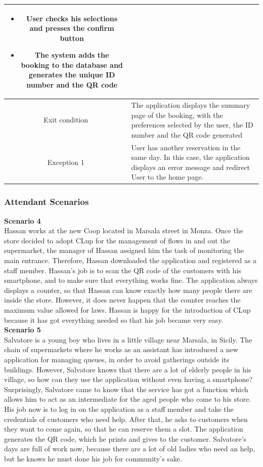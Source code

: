 \documentclass[table, 12pt]{article}
\begin{document}
\begin{longtable}{|c| p{10cm}|}
\begin{itemize}[nosep,after=\strut]
        \item User checks his selections and presses the confirm button
        \item The system adds the booking to the database and generates the unique ID number and the QR code
    \end{itemize}                                                                                                                   \\
    \hline
    Exit condition   & The application displays the summary page of the booking, with the preferences selected by the user, the ID number and the QR code generated
    \\
    \hline
    \hline
    Exception 1      & User has another reservation in the same day. In this case, the application displays an error message and redirect User to the home page.    \\
    \hline
\end{longtable}

\subsubsection{Attendant Scenarios}
\textbf{Scenario 4}\\
Hassan works at the new Coop located in Marsala street in Monza. Once the store decided to adopt CLup for the management of flows in and out the supermarket, the manager of Hassan assigned him the task of monitoring the main entrance. Therefore, Hassan downloaded the application and registered as a staff member. Hassan's job is to scan the QR code of the customers with his smartphone, and to make sure that everything works fine. The application always displays a counter, so that Hassan can know exactly how many people there are inside the store. However, it does never happen that the counter reaches the maximum value allowed for laws. Hassan is happy for the introduction of CLup because it has got everything needed so that his job became very easy.\\

\textbf{Scenario 5}\\
Salvatore is a young boy who lives in a little village near Marsala, in Sicily. The chain of supermarkets where he works as an assistant has introduced a new application for managing queues, in order to avoid gatherings outside its buildings. However, Salvatore knows that there are a lot of elderly people in his village, so how can they use the application without even having a smartphone? Surprisingly, Salvatore came to know that the service has got a function which allows him to act as an intermediate for the aged people who come to his store. His job now is to log in on the application as a staff member and take the credentials of customers who need help. After that, he asks to customers when they want to come again, so that he can reserve them a slot. The application generates the QR code, which he prints and gives to the customer. Salvatore's days are full of work now, because there are a lot of old ladies who need an help, but he knows he must done his job for community's sake.
\end{document}
